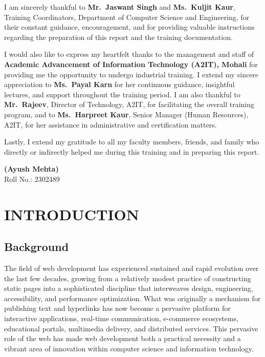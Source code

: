 \documentclass[a4paper,12pt,oneside]{report}
\numberwithin{equation}{chapter}
\numberwithin{figure}{chapter}
\numberwithin{table}{chapter}
\begin{document}
I am sincerely thankful to \textbf{Mr.~Jaswant Singh} and \textbf{Ms.~Kuljit Kaur}, Training Coordinators, Department of Computer Science and Engineering, for their constant guidance, encouragement, and for providing valuable instructions regarding the preparation of this report and the training documentation.

I would also like to express my heartfelt thanks to the management and staff of \textbf{Academic Advancement of Information Technology (A2IT), Mohali} for providing me the opportunity to undergo industrial training. I extend my sincere appreciation to \textbf{Ms.~Payal Karn} for her continuous guidance, insightful lectures, and support throughout the training period. I am also thankful to \textbf{Mr.~Rajeev}, Director of Technology, A2IT, for facilitating the overall training program, and to \textbf{Ms.~Harpreet Kaur}, Senior Manager (Human Resources), A2IT, for her assistance in administrative and certification matters.

Lastly, I extend my gratitude to all my faculty members, friends, and family who directly or indirectly helped me during this training and in preparing this report.

\vspace{10mm}
\noindent
\textbf{(Ayush Mehta)}\\
Roll No.: 2302489

\tableofcontents
\listoffigures
\listoftables


\newpage

\setcounter{page}{1}

\chapter{INTRODUCTION}

\section{Background}

The field of web development has experienced sustained and rapid evolution over the last few decades, growing from a relatively modest practice of constructing static pages into a sophisticated discipline that interweaves design, engineering, accessibility, and performance optimization. What was originally a mechanism for publishing text and hyperlinks has now become a pervasive platform for interactive applications, real-time communication, e-commerce ecosystems, educational portals, multimedia delivery, and distributed services. This pervasive role of the web has made web development both a practical necessity and a vibrant area of innovation within computer science and information technology.
\end{document}
